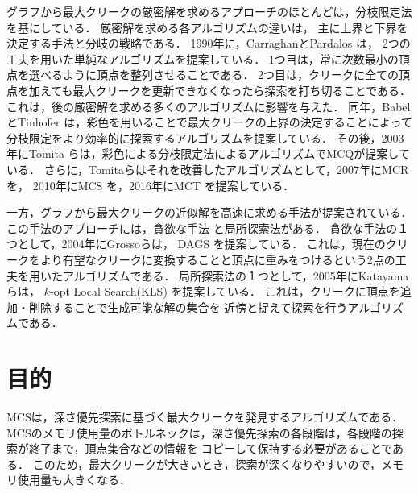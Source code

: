 グラフから最大クリークの厳密解を求めるアプローチのほとんどは，分枝限定法を基にしている．
厳密解を求める各アルゴリズムの違いは，
主に上界と下界を決定する手法と分岐の戦略である．
1990年に，CarraghanとPardalos \cite{carraghan1990exact}は，
2つの工夫を用いた単純なアルゴリズムを提案している．
1つ目は，常に次数最小の頂点を選べるように頂点を整列させることである．
2つ目は，クリークに全ての頂点を加えても最大クリークを更新できなくなったら探索を打ち切ることである．
これは，後の厳密解を求める多くのアルゴリズムに影響を与えた．
同年，BabelとTinhofer \cite{Babel1990}は，彩色を用いることで最大クリークの上界の決定することによって分枝限定をより効率的に探索するアルゴリズムを提案している．
その後，2003年にTomita \cite{tomita2003efficient}らは，彩色による分枝限定法によるアルゴリズムでMCQが提案している．
さらに，Tomitaらはそれを改善したアルゴリズムとして，2007年にMCR \cite{tomita2007efficient}を，
2010年にMCS \cite{tomita2010simple}\cite{tomita2013simple}を，2016年にMCT \cite{tomita2016much}を提案している．

一方，グラフから最大クリークの近似解を高速に求める手法が提案されている．
この手法のアプローチには，貪欲な手法%
と局所探索法がある．
貪欲な手法の１つとして，2004年にGrossoらは，
DAGS \cite{DBLP:journals/heuristics/GrossoLC04}を提案している．
これは，現在のクリークをより有望なクリークに変換することと頂点に重みをつけるという2点の工夫を用いたアルゴリズムである．
局所探索法の１つとして，2005年にKatayamaらは，
$k$-opt Local Search(KLS) \cite{katayama2005effective}を提案している．
これは，クリークに頂点を追加・削除することで生成可能な解の集合を
近傍と捉えて探索を行うアルゴリズムである．

\section{目的}
MCSは，深さ優先探索に基づく最大クリークを発見するアルゴリズムである．
MCSのメモリ使用量のボトルネックは，深さ優先探索の各段階は，各段階の探索が終了まで，頂点集合などの情報を
コピーして保持する必要があることである．
このため，最大クリークが大きいとき，探索が深くなりやすいので，メモリ使用量も大きくなる．

